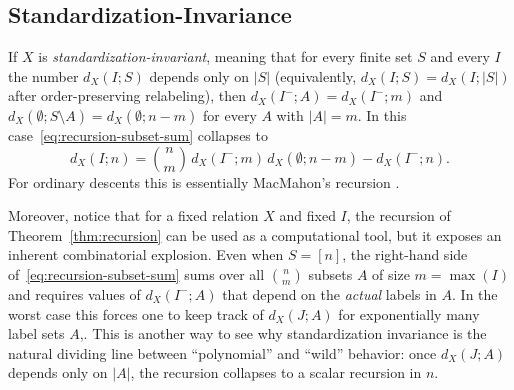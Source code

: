 \documentclass[12pt]{amsart}
\theoremstyle{definition}
\theoremstyle{remark}
\newcommand{\Sset}{\mathfrak{S}}
\newcommand{\XD}{\mathrm{XDes}}
\newcommand{\set}[1]{\left\{#1\right\}}
\newcommand{\abs}[1]{\left|#1\right|}
\begin{document}
\subsection{Standardization-Invariance}
If $X$ is \emph{standardization-invariant}, meaning that for every finite set $S$ and every $I$ the number $d_X(I;S)$
depends only on $\abs{S}$ (equivalently, $d_X(I;S)=d_X(I;\abs{S})$ after order-preserving relabeling), then
$d_X(I^-;A)=d_X(I^-;m)$ and $d_X(\emptyset;S\setminus A)=d_X(\emptyset;n-m)$ for every $A$ with $\abs{A}=m$.
In this case~\eqref{eq:recursion-subset-sum} collapses to
\begin{equation}\label{eq:recursion-binomial}
d_X(I;n)=\binom{n}{m}\,d_X(I^-;m)\,d_X(\emptyset;n-m)-d_X(I^-;n).
\end{equation}
For ordinary descents this is
essentially MacMahon's recursion \cite{macmahon1915combinatory}. 

Moreover, notice that for a fixed relation $X$ and fixed $I$, the recursion of Theorem~\ref{thm:recursion} can be used as a computational
tool, but it exposes an inherent combinatorial explosion.
Even when $S=[n]$, the right-hand side of~\eqref{eq:recursion-subset-sum} sums over all $\binom{n}{m}$ subsets $A$ of
size $m=\max(I)$ and requires values of $d_X(I^-;A)$ that depend on the \emph{actual} labels in $A$.
In the worst case this forces one to keep track of $d_X(J;A)$ for exponentially many label sets $A$,.
This is another way to see why standardization invariance is the natural dividing line between ``polynomial'' and
``wild'' behavior: once $d_X(J;A)$ depends only on $\abs{A}$, the recursion collapses to a scalar recursion in $n$.


\end{document}
